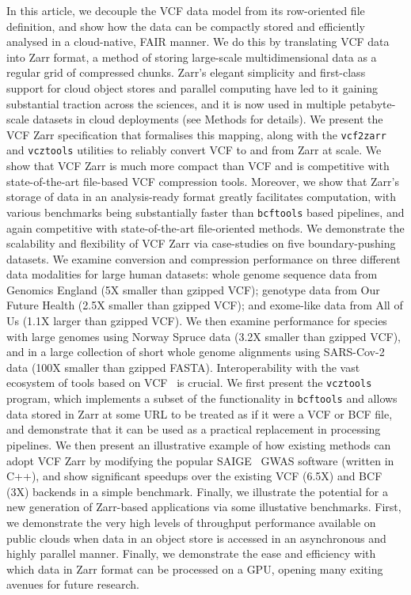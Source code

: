 \documentclass[a4paper,num-refs]{oup-contemporary}
\begin{document}
In this article, we decouple the VCF data model from its row-oriented
file definition, and show how the data can be
compactly stored and efficiently analysed in a cloud-native, FAIR manner.
We do this by translating VCF data into Zarr format,
a method of storing large-scale multidimensional data as a regular
grid of compressed chunks.
Zarr's elegant simplicity and first-class support for
cloud object stores and parallel computing have led to
it gaining substantial traction
across the sciences, and it is now used in multiple petabyte-scale
datasets in cloud deployments (see Methods for details).
We present the VCF Zarr specification that formalises this
mapping, along with the \texttt{vcf2zarr} and \texttt{vcztools} 
utilities to reliably convert VCF to and from Zarr at scale.
We show that VCF Zarr is much more compact than
VCF and is competitive with state-of-the-art
file-based VCF compression tools.
Moreover, we show that Zarr's storage of data in an analysis-ready
format greatly facilitates computation,
with various benchmarks being substantially faster than
\texttt{bcftools} based pipelines, and again competitive
with state-of-the-art file-oriented methods. 
We demonstrate the scalability and flexibility of VCF Zarr
via case-studies on five boundary-pushing datasets.
We examine conversion and compression performance on three different
data modalities for large human datasets: whole genome sequence
data from Genomics England (5X smaller than gzipped VCF);
genotype data from Our Future Health (2.5X smaller than gzipped VCF);
and exome-like data from All of Us (1.1X larger than gzipped VCF). 
We then examine performance 
for species with large genomes using Norway Spruce data (3.2X smaller
than gzipped VCF),
and in a large collection of short whole genome alignments
using SARS-Cov-2 data 
(100X %
smaller than gzipped FASTA). 
Interoperability with the vast ecosystem of tools
based on VCF~\citep{danecek2021twelve,garrison2022spectrum}
is crucial. 
We first present the \texttt{vcztools} program,
which implements a subset of the functionality in \texttt{bcftools}
and allows data stored in Zarr at some URL to be 
treated as if it were a VCF or BCF file,
and demonstrate that it can be used as a practical replacement 
in processing pipelines.
We then present an illustrative example of how existing
methods can adopt VCF Zarr by modifying the popular 
SAIGE~\cite{zhou2018efficiently, zhou2020scalable} GWAS software
(written in C++), and show significant speedups over the existing 
VCF (6.5X) and BCF (3X) backends in a simple benchmark.
Finally, we illustrate the potential 
for a new generation of Zarr-based applications via some illustative
benchmarks. First, we demonstrate the very high levels of throughput 
performance available on public clouds when data in an object 
store is accessed in an asynchronous and highly parallel manner.
Finally, we demonstrate the ease and efficiency with which data
in Zarr format can be processed on a GPU, opening many exiting
avenues for future research.
\end{document}
